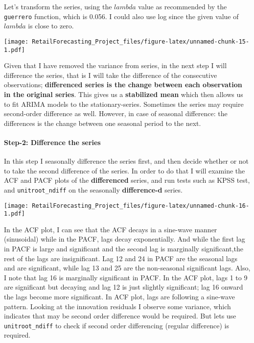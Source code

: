 \documentclass[
]{article}
\begin{document}
Let's transform the series, using the \(lambda\) value as recommended by
the \texttt{guerrero} function, which is 0.056. I could also use log
since the given value of \(lambda\) is close to zero.

\texttt{[image: RetailForecasting\_Project\_files/figure-latex/unnamed-chunk-15-1.pdf]}

Given that I have removed the variance from series, in the next step I
will difference the series, that is I will take the difference of the
consecutive observations; \textbf{differenced series is the change
between each observation in the original series}. This gives us a
\textbf{stabilized mean} which then allows us to fit ARIMA models to the
stationary-series. Sometimes the series may require second-order
difference as well. However, in case of seasonal difference: the
differences is the change between one seasonal period to the next.

\hypertarget{step-2-difference-the-series}{%
\paragraph{Step-2: Difference the
series}\label{step-2-difference-the-series}}

In this step I seasonally difference the series first, and then decide
whether or not to take the second difference of the series. In order to
do that I will examine the ACF and PACF plots of the
\textbf{differenced} series, and run tests such as KPSS test, and
\texttt{unitroot\_ndiff} on the seasonally \textbf{difference-d} series.

\texttt{[image: RetailForecasting\_Project\_files/figure-latex/unnamed-chunk-16-1.pdf]}

In the ACF plot, I can see that the ACF decays in a sine-wave manner
(sinusoidal) while in the PACF, lags decay exponentially. And while the
first lag in PACF is large and significant and the second lag is
marginally significant,the rest of the lags are insignificant. Lag 12
and 24 in PACF are the seasonal lags and are significant, while lag 13
and 25 are the non-seasonal significant lags. Also, I note that lag 16
is marginally significant in PACF. In the ACF plot, lags 1 to 9 are
significant but decaying and lag 12 is just slightly significant; lag 16
onward the lags become more significant. In ACF plot, lags are following
a sine-wave pattern. Looking at the innovation residuals I observe some
variance, which indicates that may be second order difference would be
required. But lets use \texttt{unitroot\_ndiff} to check if second order
differencing (regular difference) is required.
\end{document}

